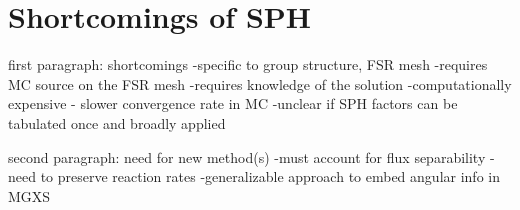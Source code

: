 



\section{Shortcomings of SPH}
\label{subsec:chap6-sph-shortcomings}

first paragraph: shortcomings
-specific to group structure, FSR mesh
-requires MC source on the FSR mesh
  -requires knowledge of the solution
-computationally expensive - slower convergence rate in MC
-unclear if SPH factors can be tabulated once and broadly applied

second paragraph: need for new method(s)
-must account for flux separability
-need to preserve reaction rates
-generalizable approach to embed angular info in MGXS
